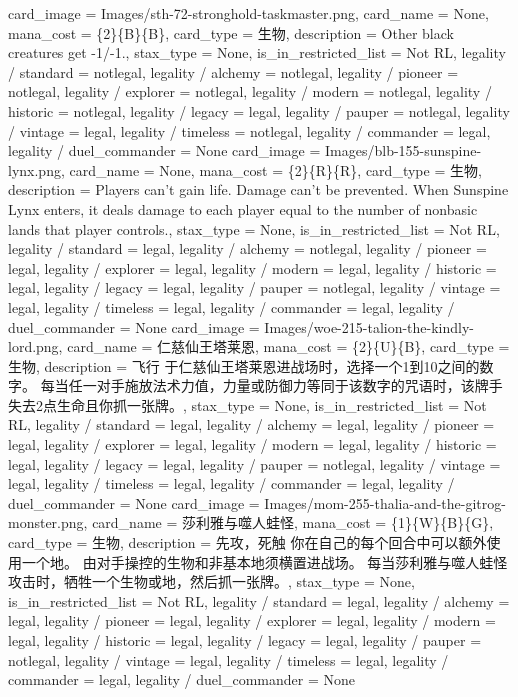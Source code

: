 \documentclass[lang = cn, color = black, 10pt]{AllThatStax}
\begin{document}
\card
{
	card_image = Images/sth-72-stronghold-taskmaster.png,
	card_name = None,
	mana_cost = \{2\}\{B\}\{B\},
	card_type = 生物,
	description = Other black creatures get -1/-1.,
	stax_type = None,
	is_in_restricted_list = Not RL,
	legality / standard = notlegal,
	legality / alchemy = notlegal,
	legality / pioneer = notlegal,
	legality / explorer = notlegal,
	legality / modern = notlegal,
	legality / historic = notlegal,
	legality / legacy = legal,
	legality / pauper = notlegal,
	legality / vintage = legal,
	legality / timeless = notlegal,
	legality / commander = legal,
	legality / duel_commander = None
}
\card
{
	card_image = Images/blb-155-sunspine-lynx.png,
	card_name = None,
	mana_cost = \{2\}\{R\}\{R\},
	card_type = 生物,
	description = Players can't gain life.
	Damage can't be prevented.
	When Sunspine Lynx enters, it deals damage to each player equal to the number of nonbasic lands that player controls.,
	stax_type = None,
	is_in_restricted_list = Not RL,
	legality / standard = legal,
	legality / alchemy = notlegal,
	legality / pioneer = legal,
	legality / explorer = legal,
	legality / modern = legal,
	legality / historic = legal,
	legality / legacy = legal,
	legality / pauper = notlegal,
	legality / vintage = legal,
	legality / timeless = legal,
	legality / commander = legal,
	legality / duel_commander = None
}
\card
{
	card_image = Images/woe-215-talion-the-kindly-lord.png,
	card_name = 仁慈仙王塔莱恩,
	mana_cost = \{2\}\{U\}\{B\},
	card_type = 生物,
	description = 飞行
	于仁慈仙王塔莱恩进战场时，选择一个1到10之间的数字。
	每当任一对手施放法术力值，力量或防御力等同于该数字的咒语时，该牌手失去2点生命且你抓一张牌。,
	stax_type = None,
	is_in_restricted_list = Not RL,
	legality / standard = legal,
	legality / alchemy = legal,
	legality / pioneer = legal,
	legality / explorer = legal,
	legality / modern = legal,
	legality / historic = legal,
	legality / legacy = legal,
	legality / pauper = notlegal,
	legality / vintage = legal,
	legality / timeless = legal,
	legality / commander = legal,
	legality / duel_commander = None
}
\card
{
	card_image = Images/mom-255-thalia-and-the-gitrog-monster.png,
	card_name = 莎利雅与噬人蛙怪,
	mana_cost = \{1\}\{W\}\{B\}\{G\},
	card_type = 生物,
	description = 先攻，死触
	你在自己的每个回合中可以额外使用一个地。
	由对手操控的生物和非基本地须横置进战场。
	每当莎利雅与噬人蛙怪攻击时，牺牲一个生物或地，然后抓一张牌。,
	stax_type = None,
	is_in_restricted_list = Not RL,
	legality / standard = legal,
	legality / alchemy = legal,
	legality / pioneer = legal,
	legality / explorer = legal,
	legality / modern = legal,
	legality / historic = legal,
	legality / legacy = legal,
	legality / pauper = notlegal,
	legality / vintage = legal,
	legality / timeless = legal,
	legality / commander = legal,
	legality / duel_commander = None
}
\end{document}
